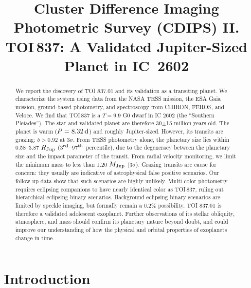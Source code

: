 \documentclass[12pt,twocolumn,tighten]{aastex63}
\begin{document}

\title{
  Cluster Difference Imaging Photometric Survey (CDIPS) II.
  TOI$\,$837: A Validated Jupiter-Sized Planet in IC~2602
}

\suppressAffiliations


\begin{abstract}
  We report the discovery of TOI 837.01 and its validation as a
  transiting planet.  We characterize the system using data from the
  NASA TESS mission, the ESA Gaia mission, ground-based photometry,
  and spectroscopy from CHIRON, FEROS, and Veloce.  We find that
  TOI$\,$837 is a $T=9.9$ G0 dwarf in IC 2602 (the ``Southern
  Pleiades'').  The star and validated planet are therefore 30$\pm$15
  million years old.  The planet is warm ($P = 8.32\,{\rm d}$) and
  roughly Jupiter-sized.  However, its transits are grazing: $b >
  0.92$ at 3$\sigma$.  From TESS photometry alone, the planetary size
  lies within 0.58--3.87 $R_{\rm Jup}$ (3$^{\rm rd}$--97$^{\rm th}$
  percentile), due to the degeneracy between the planetary size and
  the impact parameter of the transit.  From radial velocity
  monitoring, we limit the minimum mass to less than 1.20 $M_{\rm
  Jup}$ (3$\sigma$).  Grazing transits are cause for concern: they
  usually are indicative of astrophysical false positive scenarios.
  Our follow-up data show that such scenarios are highly unlikely.
  Multi-color photometry requires eclipsing companions to have nearly
  identical color as TOI$\,$837, ruling out hierarchical eclipsing
  binary scenarios.  Background eclipsing binary scenarios are limited
  by speckle imaging, but formally remain a 0.2\% possibility.  TOI
  837.01 is therefore a validated adolescent exoplanet.  Further
  observations of its stellar obliquity, atmosphere, and mass should
  confirm its planetary nature beyond doubt, and could improve our
  understanding of how the physical and orbital properties of
  exoplanets change in time.
\end{abstract}




\section{Introduction}
\end{document}
